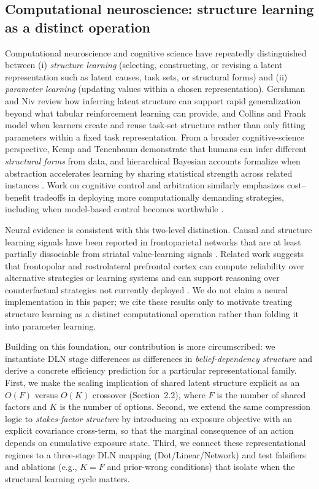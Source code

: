 \documentclass[11pt]{article}
\begin{document}
\subsection{Computational neuroscience: structure learning as a distinct operation}

Computational neuroscience and cognitive science have repeatedly distinguished between (i) \emph{structure learning} (selecting, constructing, or revising a latent representation such as latent causes, task sets, or structural forms) and (ii) \emph{parameter learning} (updating values within a chosen representation).
Gershman and Niv \cite{GershmanNiv2010} review how inferring latent structure can support rapid generalization beyond what tabular reinforcement learning can provide, and Collins and Frank \cite{CollinsFrank2013} model when learners create and reuse task-set structure rather than only fitting parameters within a fixed task representation.
From a broader cognitive-science perspective, Kemp and Tenenbaum \cite{KempTenenbaum2008} demonstrate that humans can infer different \emph{structural forms} from data, and hierarchical Bayesian accounts formalize when abstraction accelerates learning by sharing statistical strength across related instances \cite{Gershman2017}.
Work on cognitive control and arbitration similarly emphasizes cost--benefit tradeoffs in deploying more computationally demanding strategies, including when model-based control becomes worthwhile \cite{Kool2016}.

Neural evidence is consistent with this two-level distinction.
Causal and structure learning signals have been reported in frontoparietal networks that are at least partially dissociable from striatal value-learning signals \cite{Tomov2018}.
Related work suggests that frontopolar and rostrolateral prefrontal cortex can compute reliability over alternative strategies or learning systems \cite{Lee2014} and can support reasoning over counterfactual strategies not currently deployed \cite{Koechlin2014}.
We do not claim a neural implementation in this paper; we cite these results only to motivate treating structure learning as a distinct computational operation rather than folding it into parameter learning.

Building on this foundation, our contribution is more circumscribed: we instantiate DLN stage differences as differences in \emph{belief-dependency structure} and derive a concrete efficiency prediction for a particular representational family.
First, we make the scaling implication of shared latent structure explicit as an $O(F)$ versus $O(K)$ crossover (Section~2.2), where $F$ is the number of shared factors and $K$ is the number of options.
Second, we extend the same compression logic to \emph{stakes-factor structure} by introducing an exposure objective with an explicit covariance cross-term, so that the marginal consequence of an action depends on cumulative exposure state.
Third, we connect these representational regimes to a three-stage DLN mapping (Dot/Linear/Network) and test falsifiers and ablations (e.g., $K{=}F$ and prior-wrong conditions) that isolate when the structural learning cycle matters.
\end{document}
